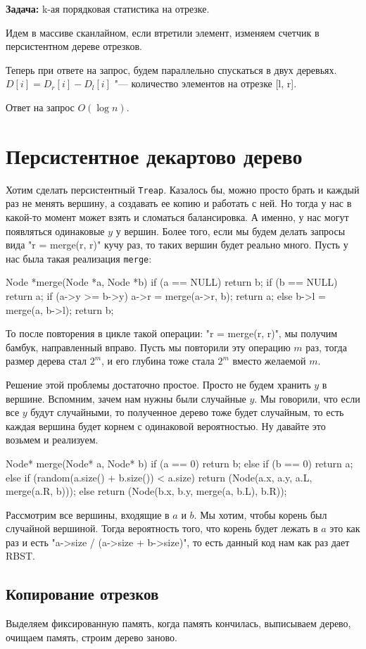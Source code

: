 \textbf{Задача:} k-ая порядковая статистика на отрезке.

Идем в массиве сканлайном, если втретили элемент, изменяем счетчик в персистентном 
дереве отрезков.

Теперь при ответе на запрос, будем параллельно спускаться в двух деревьях. 
$D[i] = D_r[i] - D_l[i]$  "--- количество элементов на отрезке [l, r].

Ответ на запрос $O(\log n)$.

\section{Персистентное декартово дерево}
Хотим сделать персистентный \texttt{Treap}. Казалось бы, можно просто брать и каждый раз не менять вершину, а 
создавать ее копию и работать с ней. Но тогда у нас в какой-то момент может взять и сломаться балансировка.
А именно, у нас могут появляться одинаковые $y$ у вершин. 
Более того, если мы будем делать запросы вида \cpp"r = merge(r, r)" кучу раз, то таких вершин будет реально много.
Пусть у нас была такая реализация \texttt{merge}:
\begin{cppcode}
Node *merge(Node *a, Node *b){
    if (a == NULL) return b;
    if (b == NULL) return a;
    if (a->y >= b->y) {
        a->r = merge(a->r, b);
        return a;
    } else {
        b->l = merge(a, b->l);
        return b;
    }
}   
\end{cppcode}
То после повторения в цикле такой операции: \cpp"r = merge(r, r)", мы получим бамбук, направленный вправо.
Пусть мы повторили эту операцию $m$ раз, тогда размер дерева стал $2^m$, и его глубина тоже стала $2^m$ 
вместо желаемой $m$.

Решение этой проблемы достаточно простое. Просто не будем хранить $y$ в вершине. 
Вспомним, зачем нам нужны были случайные $y$. 
Мы говорили, что если все $y$ будут случайными, то полученное дерево тоже будет случайным, то есть каждая вершина
будет корнем с одинаковой вероятностью. 
Ну давайте это возьмем и реализуем.

\begin{cppcode}
Node* merge(Node* a, Node* b) {
    if (a == 0) return b;
    else if (b == 0) return a;
    else if (random(a.size() + b.size()) < a.size) {
        return (Node(a.x, a.y, a.L, merge(a.R, b)));
    } else {
        return (Node(b.x, b.y, merge(a, b.L), b.R));
    }
}
\end{cppcode}

Рассмотрим все вершины, входящие в $a$ и $b$. 
Мы хотим, чтобы корень был случайной вершиной. 
Тогда вероятность того, что корень будет лежать в $a$ это как раз и есть \cpp"a->size / (a->size + b->size)", то есть данный
код нам как раз дает RBST.

\subsection{Копирование отрезков}
Выделяем фиксированную память, когда память кончилась, выписываем дерево, очищаем память, 
строим дерево заново.
